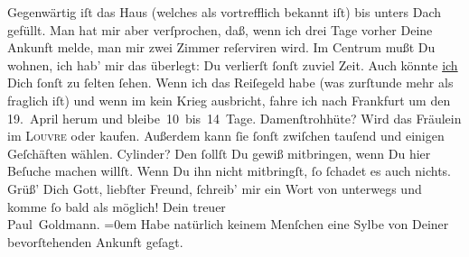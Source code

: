 \begin{ledgroupsized}[t]{13cm}
               Gegenwärtig iſt das Haus
               (welches als vortrefflich bekannt iſt) bis unters Dach gefüllt. Man hat mir aber
               verſprochen, daß, wenn ich drei Tage vorher Deine Ankunft melde, man mir zwei Zimmer
               reſerviren wird. Im Centrum
               mußt Du wohnen, ich hab’ mir das überlegt: Du verlierſt ſonſt zuviel Zeit. Auch
               könnte \uline{ich} Dich ſonſt zu ſelten ſehen.\pend
           \pstart
           {\pb}Wenn ich das Reiſegeld habe (was zurſtunde mehr als
               fraglich iſt) und wenn im \label{K_L02807-3v}\label{K_L02807-3h} kein Krieg ausbricht, fahre ich nach Frankfurt um den 19. April herum und
               bleibe 10 bis 14 Tage.\pend
           \pstart
           Damenſtrohhüte? Wird  das Fräulein im \textsc{Louvre} oder \label{K_L02807-4v}\label{K_L02807-4h} kaufen.  Außerdem kann ſie ſonſt zwiſchen
               tauſend und einigen Geſchäften wählen.\pend
           \pstart
           Cylinder? Den ſollſt Du gewiß mitbringen, wenn Du hier Beſuche machen willſt. Wenn
                  {\pb}Du ihn nicht mitbringſt, ſo ſchadet es auch
               nichts.\pend
           \pstart
           Grüß’ Dich Gott, liebſter Freund, ſchreib’ mir ein Wort \strikeout{\textcolor{gray}{×}} von unterwegs und komme ſo bald als möglich!\pend
           \pstart
           Dein treuer {\\[\baselineskip]}\spacefill\mbox{Paul Goldmann.}\pend
           \leftskip=0em{}\pstart
           \noindent{}Habe natürlich keinem Menſchen eine Sylbe von Deiner bevorſtehenden Ankunft
                  geſagt.\pend
           
         
         \endnumbering{}\end{ledgroupsized}  \newcommand{\dateiname}{L02807}\newcommand{\titel}{Paul Goldmann an Arthur Schnitzler, 4. 4. [1897]}\newcommand{\editorInnen}{Martin Anton Müller und Laura Untner}
      